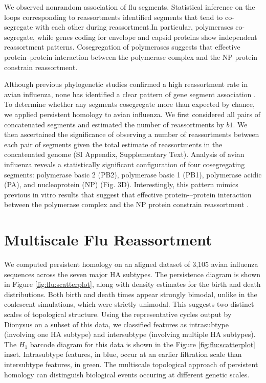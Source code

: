 We observed nonrandom association of flu segments.
Statistical inference on the loops corresponding to reassortments identified segments that tend to co-segregate with each other during reassortment.In particular, polymerases co-segregate, while genes coding for envelope and capsid proteins show independent reassortment patterns.
Cosegregation of polymerases suggests that effective protein–protein interaction between the polymerase complex and the NP protein constrain reassortment. 

Although previous phylogenetic studies confirmed a high reassortment rate in avian influenza, none has identified a clear pattern of gene segment association \cite{Dugan:2008iba}.
To determine whether any segments cosegregate more than expected by chance, we applied persistent homology to avian influenza.
We first considered all pairs of concatenated segments and estimated the number of reassortments by $b1$.
We then ascertained the significance of observing a number of reassortments between each pair of segments given the total estimate of reassortments in the concatenated genome (SI Appendix, Supplementary Text).
Analysis of avian influenza reveals a statistically significant configuration of four cosegregating segments: polymerase basic 2 (PB2), polymerase basic 1 (PB1), polymerase acidic (PA), and nucleoprotein (NP) (Fig. 3D).
Interestingly, this pattern mimics previous in vitro results that suggest that effective protein-–protein interaction between the polymerase complex and the NP protein constrain reassortment \cite{Lubeck:1979ws}.

\section{Multiscale Flu Reassortment}
\label{flu:multiscale_reassortment}

We computed persistent homology on an aligned dataset of 3,105 avian influenza sequences across the seven major HA subtypes.
The persistence diagram is shown in Figure \ref{fig:flu:scatterplot}, along with density estimates for the birth and death distributions.
Both birth and death times appear strongly bimodal, unlike in the coalescent simulations, which were strictly unimodal.
This suggests two distinct scales of topological structure.
Using the representative cycles output by Dionysus on a subset of this data, we classified features as intrasubtype (involving one HA subtype) and intersubtype (involving multiple HA subtypes).
The $H_1$ barcode diagram for this data is shown in the Figure \ref{fig:flu:scatterplot} inset.
Intrasubtype features, in blue, occur at an earlier filtration scale than intersubtype features, in green.
The multiscale topological approach of persistent homology can distinguish biological events occuring at different genetic scales.

